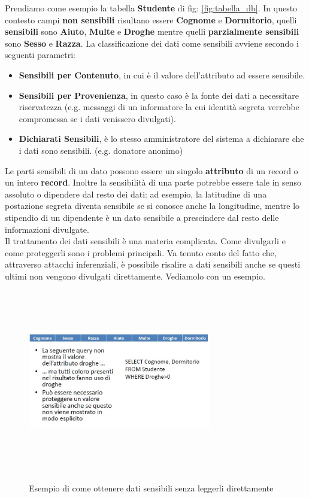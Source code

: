 Prendiamo come esempio la tabella \textbf{Studente} di fig: \ref{fig:tabella_db}. In questo contesto campi \textbf{non sensibili} risultano essere \textbf{Cognome} e \textbf{Dormitorio}, quelli \textbf{sensibili} sono \textbf{Aiuto}, \textbf{Multe} e \textbf{Droghe} mentre quelli \textbf{parzialmente sensibili} sono \textbf{Sesso} e \textbf{Razza}. La classificazione dei dati come sensibili avviene secondo i seguenti parametri:

\begin{itemize}
	\item \textbf{Sensibili per Contenuto}, in cui è il valore dell'attributo ad essere sensibile.
	\item \textbf{Sensibili per Provenienza}, in questo caso è la fonte dei dati a necessitare riservatezza (e.g. messaggi di un informatore la cui identità segreta verrebbe compromessa se i dati venissero divulgati).
	\item \textbf{Dichiarati Sensibili}, è lo stesso amministratore del sistema a dichiarare che i dati sono sensibili. (e.g.  donatore anonimo)
\end{itemize}

Le parti sensibili di un dato possono essere un singolo \textbf{attributo} di un record o un intero \textbf{record}. Inoltre la sensibilità di una parte potrebbe essere tale in senso assoluto o dipendere dal resto dei dati: ad esempio, la latitudine di una postazione segreta diventa sensibile se si conosce anche la longitudine, mentre lo stipendio di un dipendente è un dato sensibile a prescindere dal resto delle informazioni divulgate. \\

Il trattamento dei dati sensibili è una materia complicata. Come divulgarli e come proteggerli sono i problemi principali. Va tenuto conto del fatto che, attraverso attacchi inferenziali, è possibile risalire a dati sensibili anche se questi ultimi non vengono divulgati direttamente. Vediamolo con un esempio.
\begin{figure}[htbp]
	\centering
		{\includegraphics[height=8cm, width=8cm, keepaspectratio]{Immagini/dati_sensibili/prot_dati_02.JPG}}
			\caption{Esempio di come ottenere dati sensibili senza leggerli direttamente \label{fig:query_db}}
\end{figure}

